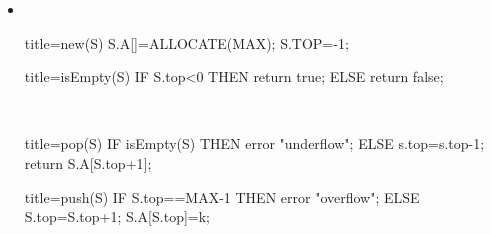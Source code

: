 \documentclass[
    12pt,
    a4paper,
    ngerman,
    color=3b,%
    marginpar=false,
    colorback=false,
    leqno,
]{tudaexercise}
\begin{document}
\begin{itemize}
    \item {}\\
          \begin{minipage}[t]{.4\textwidth}
              \begin{ccode}[autogobble]{title=new(S)}
                  S.A[]=ALLOCATE(MAX);
                  S.TOP=-1;
              \end{ccode}
          \end{minipage}
          \begin{minipage}[t]{.4\textwidth}
              \begin{ccode}[autogobble]{title=isEmpty(S)}
                  IF S.top<0 THEN
                    return true;
                  ELSE
                    return false;
              \end{ccode}
          \end{minipage}
          \\
          \begin{minipage}[t]{.4\textwidth}
              \begin{ccode}[autogobble]{title=pop(S)}
                  IF isEmpty(S) THEN
                    error "underflow";
                  ELSE
                    s.top=s.top-1;
                    return S.A[S.top+1];
              \end{ccode}
          \end{minipage}
          \begin{minipage}[t]{.4\textwidth}
              \begin{ccode}[autogobble]{title=push(S)}
                  IF S.top==MAX-1 THEN
                    error "overflow";
                  ELSE
                    S.top=S.top+1;
                    S.A[S.top]=k;
              \end{ccode}
          \end{minipage}


\end{itemize}
\end{document}
